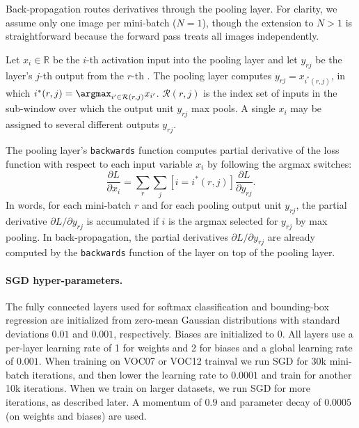 Back-propagation routes derivatives through the \roi pooling layer.
For clarity, we assume only one image per mini-batch ($N=1$), though the extension to $N > 1$ is straightforward because the forward pass treats all images independently.

Let $x_i \in \mathbb{R}$ be the $i$-th activation input into the \roi pooling layer and let $y_{rj}$ be the layer's $j$-th output from the $r$-th \roi.
The \roi pooling layer computes $y_{rj} = x_{i^*(r,j)}$, in which $i^*(r,j) = \argmax_{i' \in \mathcal{R}(r,j)} x_{i'}$.
$\mathcal{R}(r,j)$ is the index set of inputs in the sub-window over which the output unit $y_{rj}$ max pools.
A single $x_i$ may be assigned to several different outputs $y_{rj}$.

The \roi pooling layer's \texttt{backwards} function computes partial derivative of the loss function with respect to each input variable $x_i$ by following the argmax switches:
\begin{equation}
  \frac{\partial L}{\partial x_i} = \sum_{r} \sum_{j}
  \left[i = i^*(r,j)\right] \frac{\partial L}{\partial y_{rj}}.
\end{equation}
In words, for each mini-batch \roi $r$ and for each pooling output unit $y_{rj}$, the partial derivative $\partial L/\partial y_{rj}$ is accumulated if $i$ is the argmax selected for $y_{rj}$ by max pooling.
In back-propagation, the partial derivatives $\partial L/\partial y_{rj}$ are already computed by the \texttt{backwards} function of the layer on top of the \roi pooling layer.

\paragraph{SGD hyper-parameters.}
The fully connected layers used for softmax classification and bounding-box regression are initialized from zero-mean Gaussian distributions with standard deviations $0.01$ and $0.001$, respectively.
Biases are initialized to $0$.
All layers use a per-layer learning rate of 1 for weights and 2 for biases and a global learning rate of $0.001$.
When training on VOC07 or VOC12 trainval we run SGD for 30k mini-batch iterations, and then lower the learning rate to $0.0001$ and train for another 10k iterations.
When we train on larger datasets, we run SGD for more iterations, as described later.
A momentum of $0.9$ and parameter decay of $0.0005$ (on weights and biases) are used.




